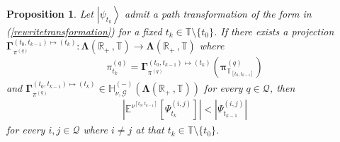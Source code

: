 \documentclass[10pt,a4paper]{amsart}
\newtheorem{prop}{Proposition}
\def\G{\mathscr{G}}
\def\R{\mathbb{R}}
\def\T{\mathbb{T}}
\begin{document}
\begin{prop}
\label{mainproposition}
Let $\left|\psi_{t_{k}}\right\rangle$ admit a path transformation of the form in {\rm (\ref{rewritetransformation})} for a fixed $t_k\in\T\setminus\{t_0\}$. If there exists a projection $\boldsymbol{\Gamma}_{\pi^{(q)}}^{(t_0,t_{k-1})\mapsto(t_k)}: \boldsymbol{\Lambda}(\R_+ \,, \T) \rightarrow \boldsymbol{\Lambda}(\R_+ \,, \T)$ where 
\begin{align}
\pi^{(q)}_{t_{k}} = \boldsymbol{\Gamma}_{\pi^{(q)}}^{(t_0,t_{k-1})\mapsto(t_k)}\left(  \boldsymbol{\pi}_{\T_{[t_0,t_{k-1}]}}^{(q)} \right)  \label{projectionforpi}
\end{align}
and $\boldsymbol{\Gamma}_{\pi^{(q)}}^{(t_0,t_{k-1})\mapsto(t_k)} \in \mathbb{H}^{(-)}_{\nu,\G}(\boldsymbol{\Lambda}(\R_+ \,, \T))$ for every $q\in\mathcal{Q}$, then
\begin{align}
\left| \mathbb{E}^{\nu^{[t_{0},t_{k-1}]}}\left[\Psi_{t_{k}}^{(i,j)}\right] \right| < \left| \Psi_{t_{k-1}}^{(i,j)} \right| \label{decoheremceoffdiagnal}
\end{align}
for every $i,j\in\mathcal{Q}$ where $i\neq j$ at that $t_k\in\T\setminus\{t_0\}$.
\end{prop}
\end{document}
